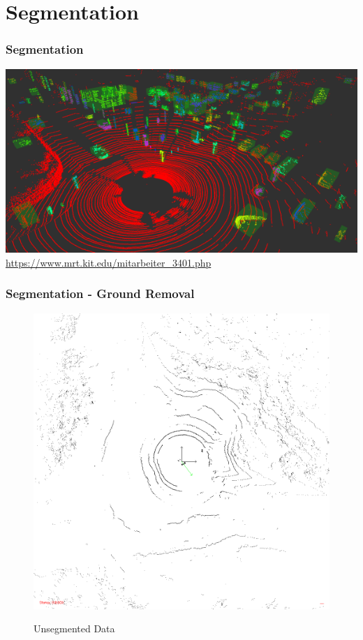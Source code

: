 \documentclass[nosymbols]{beamer}	%
\begin{document}
\section{Segmentation}

\begin{frame}
\frametitle{Segmentation}
\begin{center}
 \includegraphics[width=\textwidth,height=0.7\textheight,keepaspectratio]{bilder/segmented_objects.png} \\
 \tiny{\url{https://www.mrt.kit.edu/mitarbeiter_3401.php}}
\end{center}
\end{frame}



\begin{frame}
\frametitle{Segmentation - Ground Removal}
\begin{figure}[!ht]
\caption{Unsegmented Data}
\includegraphics[width=\textwidth,height=0.7\textheight,keepaspectratio]{bilder/before_seg/img100084.png}
\label{segments}
\end{figure}
\end{frame}
\end{document}

